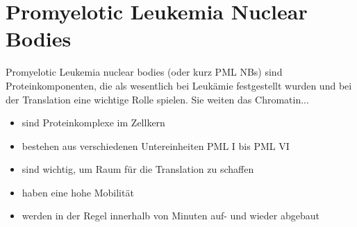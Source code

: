\section{Promyelotic Leukemia Nuclear Bodies}
Promyelotic Leukemia nuclear bodies (oder kurz PML NBs) sind Proteinkomponenten, die als wesentlich bei Leukämie festgestellt wurden und bei der Translation eine wichtige Rolle spielen. Sie weiten das Chromatin...
\begin{itemize}
	\item sind Proteinkomplexe im Zellkern
	\item bestehen aus verschiedenen Untereinheiten PML I bis PML VI
	\item sind wichtig, um Raum für die Translation zu schaffen
	\item haben eine hohe Mobilität
	\item werden in der Regel innerhalb von Minuten auf- und wieder abgebaut
\end{itemize}